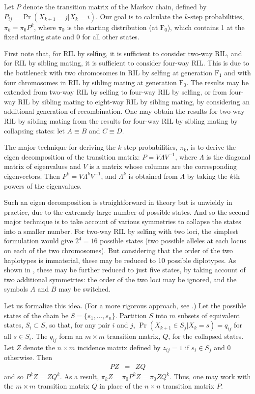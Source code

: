 \documentclass[12pt,letterpaper]{article}
\begin{document}
Let $P$ denote the transition matrix of the Markov chain, defined by $P_{ij} =
\Pr(X_{k+1} = j | X_k = i)$.  Our goal is to calculate the $k$-step
probabilities, $\pi_k = \pi_0
P^k$, where $\pi_0$ is the starting distribution (at
$\text{F}_0$), which contains 1 at the fixed starting
state and 0 for all other states.

First note that, for RIL by selfing, it is sufficient to consider
two-way RIL, and for RIL by sibling mating, it is sufficient to
consider four-way RIL.  This is due to the bottleneck with two
chromosomes in RIL by selfing at generation $\text{F}_1$ and with four
chromosomes in RIL by sibling mating at generation $\text{F}_0$.  The
results may be extended from two-way RIL by selfing to four-way RIL by
selfing, or from four-way RIL by sibling mating to eight-way RIL by
sibling mating, by considering an additional generation of
recombination.  One may
obtain the results for two-way RIL by sibling mating from the results
for four-way RIL by sibling mating
by collapsing states: let $A \equiv B$ and $C \equiv D$.

The major technique for deriving the $k$-step probabilities, $\pi_k$,
is to derive the eigen decomposition of the transition matrix: $P = V
\Lambda V^{-1}$, where $\Lambda$ is the diagonal matrix of eigenvalues and $V$ is
a matrix whose columns are the corresponding eigenvectors.  Then $P^k
= V \Lambda^k V^{-1}$, and $\Lambda^k$ is obtained from $\Lambda$ by taking the
$k$th powers of the eigenvalues.

Such an eigen decomposition is straightforward in theory but is
unwieldy in practice, due to the extremely large number of possible
states.  And so the second major technique is to take account of
various symmetries to collapse the states into a smaller number.  For
two-way RIL by selfing with two loci, the simplest formulation would
give $2^4 = 16$ possible states (two possible alleles at each locus on
each of the two chromosomes).  But considering that the order of the two
haplotypes is immaterial, these may be reduced to 10 possible
diplotypes.  As shown in \citet{Haldane1931}, these may be further
reduced to just five states, by taking account of two additional
symmetries: the order of the two loci may be ignored, and the symbols
$A$ and $B$ may be switched.  

Let us formalize this idea.  (For a more rigorous approach, see
\citet{Burke1958}.)  Let the possible states of the chain be $S =
\{s_1, \dots, s_n\}$.  Partition $S$ into $m$ subsets of equivalent
states, $S_i \subset S$, so that, for any pair $i$ and $j$,
$\Pr(X_{k+1} \in S_j | X_k = s) = q_{ij}$ for all $s \in S_i$.
The $q_{ij}$ form an $m \times m$ transition matrix, $Q$, for the
collapsed states.  Let $Z$ denote the $n \times m$ incidence matrix
defined by $z_{ij} = 1$ if $s_i \in S_j$ and 0 otherwise.  Then 
\begin{eqnarray}
PZ & = & ZQ
\end{eqnarray}
and so $P^kZ = ZQ^k$.  As a result, $\pi_k Z = \pi_0 P^k Z =
\pi_0 Z Q^k$.  Thus, one may work with the $m \times m$ transition
matrix $Q$ in place of the $n \times n$ transition matrix $P$.  
\end{document}
